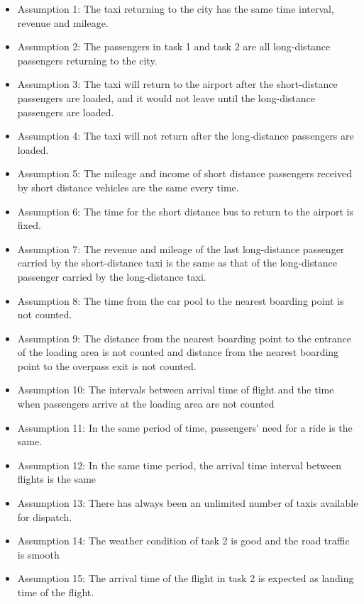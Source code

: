 \begin{itemize}
  \item  Assumption 1: The taxi returning to the city has the same time interval, revenue and mileage.
   
  \item Assumption 2: The passengers in task 1 and task 2 are all long-distance passengers returning to the city. 
  
  \item Assumption 3: The taxi will return to the airport after the short-distance passengers are loaded, and it would not leave until the long-distance passengers are loaded.
  \item Assumption 4: The taxi will not return after the long-distance passengers are loaded.
  \item Assumption 5: The mileage and income of short distance passengers received by short distance vehicles are the same every time.
  \item Assumption 6: The time for the short distance bus to return to the airport is fixed. 
  \item Assumption 7: The revenue and mileage of the last long-distance passenger carried by the short-distance taxi is the same as that of the long-distance passenger carried by the long-distance taxi.
  \item Assumption 8: The time from the car pool to the nearest boarding point is not counted.
  \item Assumption 9: The distance from the nearest boarding point to the entrance of the loading area is not counted and distance from the nearest boarding point to the overpass exit is not counted.
  \item Assumption 10: The intervals between arrival time of flight and the time when passengers arrive at the loading area are not counted 
  \item Assumption 11: In the same period of time, passengers' need for a ride is the same. 
  \item Assumption 12: In the same time period, the arrival time interval between flights is the same 
  \item Assumption 13: There has always been an unlimited number of taxis available for dispatch. 
  \item Assumption 14: The weather condition of task 2 is good and the road traffic is smooth 
  \item Assumption 15: The arrival time of the flight in task 2 is expected as landing time of the flight.
  
  
\end{itemize}